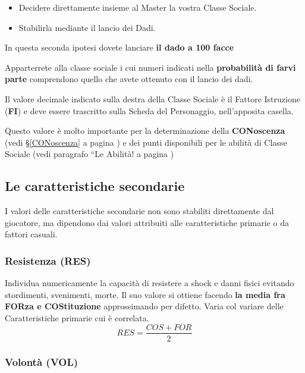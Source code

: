 \begin{itemize}
\item Decidere direttamente insieme al Master la vostra Classe
  Sociale.
\item Stabilirla mediante il lancio dei Dadi.
\end{itemize}

In questa seconda ipotesi dovete lanciare \textbf{il dado a 100 facce}

Apparterrete alla classe sociale i cui numeri indicati nella
\textbf{probabilit\`a di farvi parte} comprendono quello che avete
ottenuto con il lancio dei dadi.


Il valore decimale indicato sulla destra della Classe Sociale \`e il
Fattore Istruzione (\textbf{FI}) e deve essere trascritto sulla Scheda
del Personaggio, nell'apposita casella.

Questo valore \`e molto importante per la determinazione della
\textbf{CONoscenza} (vedi \S \ref{CONoscenza} a pagina
\pageref{CONoscenza}) e dei punti disponibili per le abilit\`a di
Classe Sociale (vedi paragrafo ``Le Abilit\`a! a pagina
\pageref{abilita})

{\raggedright \subsection{Le caratteristiche secondarie}}

I valori delle caratteristiche secondarie non sono stabiliti
direttamente dal giocatore, ma dipendono dai valori attribuiti
alle caratteristiche primarie o da fattori casuali.

\subsubsection{Resistenza (RES)}

Individua numericamente la capacit\`a di resistere a shock e danni
fisici evitando stordimenti, svenimenti, morte. Il suo valore si
ottiene facendo \textbf{la media fra FORza e COStituzione}
approssimando per difetto. Varia col variare delle Caratteristiche
primarie cui \`e correlata. $$RES=\frac{COS + FOR}{2}$$

\subsubsection{Volont\`a (VOL)}

